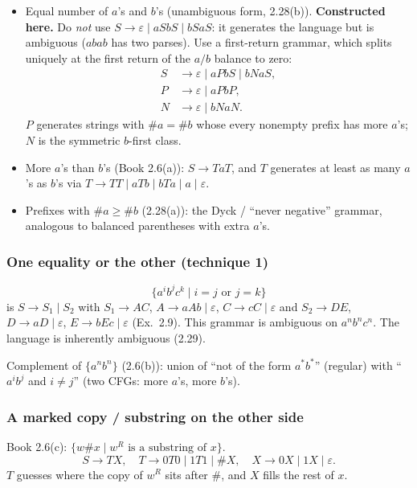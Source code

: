 \documentclass[11pt,a4paper]{article}
\newcommand{\eps}{\varepsilon}
\begin{document}
\begin{itemize}
  \item Equal number of $a$'s and $b$'s (unambiguous form, 2.28(b)).
        \textbf{Constructed here.} Do \emph{not} use
        $S\to\eps\mid aSbS\mid bSaS$: it generates the language but
        is ambiguous ($abab$ has two parses). Use a first-return
        grammar, which splits uniquely at the first return of the
        $a/b$ balance to zero:
        \[
          \begin{aligned}
            S&\to\eps\mid aPbS\mid bNaS,\\
            P&\to\eps\mid aPbP,\\
            N&\to\eps\mid bNaN.
          \end{aligned}
        \]
        $P$ generates strings with $\#a=\#b$ whose every nonempty
        prefix has more $a$'s; $N$ is the symmetric $b$-first class.
  \item More $a$'s than $b$'s (Book 2.6(a)):
        $S\to TaT$, and $T$ generates at least as many $a$'s as
        $b$'s via $T\to TT\mid aTb\mid bTa\mid a\mid\eps$.
  \item Prefixes with $\#a\ge\#b$ (2.28(a)): the Dyck /
        ``never negative'' grammar, analogous to balanced parentheses
        with extra $a$'s.
\end{itemize}

\subsubsection{One equality or the other (technique 1)}

\[
  \{a^ib^jc^k\mid i=j\text{ or }j=k\}
\]
is $S\to S_1\mid S_2$ with $S_1\to AC$, $A\to aAb\mid\eps$,
$C\to cC\mid\eps$ and $S_2\to DE$, $D\to aD\mid\eps$,
$E\to bEc\mid\eps$ (Ex.~2.9). This grammar is ambiguous on
$a^nb^nc^n$. The language is inherently ambiguous (2.29).

Complement of $\{a^nb^n\}$ (2.6(b)): union of
``not of the form $a^*b^*$'' (regular) with
``$a^ib^j$ and $i\neq j$'' (two CFGs: more $a$'s, more $b$'s).

\subsubsection{A marked copy / substring on the other side}

Book 2.6(c): $\{w\#x\mid w^R\text{ is a substring of }x\}$.
\[
  S\to TX,\quad
  T\to 0T0\mid 1T1\mid \#X,\quad
  X\to 0X\mid 1X\mid\eps.
\]
$T$ guesses where the copy of $w^R$ sits after $\#$, and $X$ fills
the rest of $x$.
\end{document}
